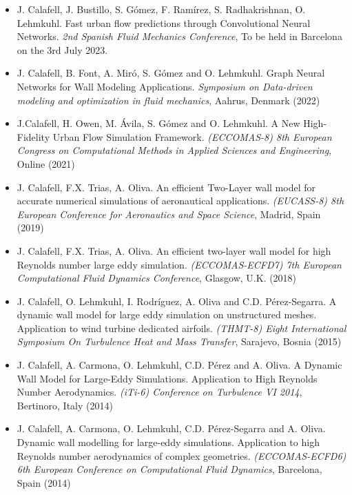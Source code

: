 \documentclass{article}
\begin{document}
\begin{itemize}
\item J. Calafell, J. Bustillo, S. Gómez, F. Ramírez, S. Radhakrishnan, O. Lehmkuhl. Fast urban flow predictions through Convolutional Neural Networks. {\it 2nd Spanish Fluid Mechanics Conference}, To be held in Barcelona on the 3rd July 2023.

\item J. Calafell, B. Font, A. Miró, S. Gómez and O. Lehmkuhl. Graph Neural Networks for Wall Modeling Applications. {\it Symposium on Data-driven modeling and optimization in fluid mechanics}, Aahrus, Denmark (2022)

\item J.Calafell, H. Owen, M. Ávila, S. Gómez and O. Lehmkuhl. A New High-Fidelity Urban Flow Simulation Framework. {\it (ECCOMAS-8) 8th European Congress on Computational Methods in Applied Sciences and Engineering}, Online (2021)

\item J. Calafell, F.X. Trias, A. Oliva. An efficient Two-Layer wall model for accurate numerical simulations of
aeronautical applications. {\it (EUCASS-8) 8th European Conference for Aeronautics and Space Science}, Madrid, Spain (2019)

\item J. Calafell, F.X. Trias, A. Oliva. An efficient two-layer wall model for high Reynolds number large eddy
simulation. {\it (ECCOMAS-ECFD7) 7th European Computational Fluid Dynamics Conference}, Glasgow, U.K. (2018)

\item J. Calafell, O. Lehmkuhl, I. Rodríguez, A. Oliva and C.D. Pérez-Segarra. A dynamic wall model for large eddy simulation on unstructured meshes. Application to wind turbine dedicated airfoils. {\it (THMT-8) Eight International Symposium On Turbulence Heat and Mass Transfer}, Sarajevo, Bosnia (2015)

\item J. Calafell, A. Carmona, O. Lehmkuhl, C.D. Pérez and A. Oliva. A Dynamic Wall Model for Large-Eddy Simulations. Application to High Reynolds Number Aerodynamics. {\it (iTi-6) Conference on Turbulence VI 2014}, Bertinoro, Italy (2014)

\item J. Calafell, A. Carmona, O. Lehmkuhl, C.D. Pérez-Segarra and A. Oliva. Dynamic wall modelling for large-eddy simulations. Application to high Reynolds number aerodynamics of complex geometries. {\it (ECCOMAS-ECFD6) 6th European Conference on Computational Fluid Dynamics}, Barcelona, Spain (2014)


\end{itemize}
\end{document}
